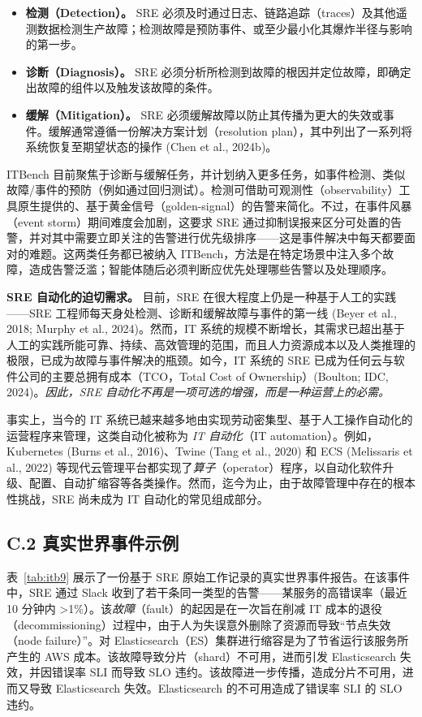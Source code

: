 \begin{itemize}
\item \textbf{检测（Detection）。} SRE 必须及时通过日志、链路追踪（traces）及其他遥测数据检测生产故障；检测故障是预防事件、或至少最小化其爆炸半径与影响的第一步。
\item \textbf{诊断（Diagnosis）。} SRE 必须分析所检测到故障的根因并定位故障，即确定出故障的组件以及触发该故障的条件。
\item \textbf{缓解（Mitigation）。} SRE 必须缓解故障以防止其传播为更大的失效或事件。缓解通常遵循一份解决方案计划（resolution plan），其中列出了一系列将系统恢复至期望状态的操作 (Chen et al., 2024b)。
\end{itemize}

ITBench 目前聚焦于诊断与缓解任务，并计划纳入更多任务，如事件检测、类似故障/事件的预防（例如通过回归测试）。检测可借助可观测性（observability）工具原生提供的、基于黄金信号（golden-signal）的告警来简化。不过，在事件风暴（event storm）期间难度会加剧，这要求 SRE 通过抑制误报来区分可处置的告警，并对其中需要立即关注的告警进行优先级排序——这是事件解决中每天都要面对的难题。这两类任务都已被纳入 ITBench，方法是在特定场景中注入多个故障，造成告警泛滥；智能体随后必须判断应优先处理哪些告警以及处理顺序。

\textbf{SRE 自动化的迫切需求。} 目前，SRE 在很大程度上仍是一种基于人工的实践——SRE 工程师每天身处检测、诊断和缓解故障与事件的第一线 (Beyer et al., 2018; Murphy et al., 2024)。然而，IT 系统的规模不断增长，其需求已超出基于人工的实践所能可靠、持续、高效管理的范围，而且人力资源成本以及人类推理的极限，已成为故障与事件解决的瓶颈。如今，IT 系统的 SRE 已成为任何云与软件公司的主要总拥有成本（TCO，Total Cost of Ownership）(Boulton; IDC, 2024)。\textit{因此，SRE 自动化不再是一项可选的增强，而是一种运营上的必需。}

事实上，当今的 IT 系统已越来越多地由实现劳动密集型、基于人工操作自动化的运营程序来管理，这类自动化被称为 \textit{IT 自动化}（IT automation）。例如，Kubernetes (Burns et al., 2016)、Twine (Tang et al., 2020) 和 ECS (Melissaris et al., 2022) 等现代云管理平台都实现了\textit{算子}（operator）程序，以自动化软件升级、配置、自动扩缩容等各类操作。然而，迄今为止，由于故障管理中存在的根本性挑战，SRE 尚未成为 IT 自动化的常见组成部分。

\subsection{C.2 真实世界事件示例}

表~\ref{tab:itb9} 展示了一份基于 SRE 原始工作记录的真实世界事件报告。在该事件中，SRE 通过 Slack 收到了若干条同一类型的告警——某服务的高错误率（最近 10 分钟内 >1\%）。该\textit{故障}（fault）的起因是在一次旨在削减 IT 成本的退役（decommissioning）过程中，由于人为失误意外删除了资源而导致“节点失效（node failure）”。对 Elasticsearch（ES）集群进行缩容是为了节省运行该服务所产生的 AWS 成本。该故障导致分片（shard）不可用，进而引发 Elasticsearch 失效，并因错误率 SLI 而导致 SLO 违约。该故障进一步传播，造成分片不可用，进而又导致 Elasticsearch 失效。Elasticsearch 的不可用造成了错误率 SLI 的 SLO 违约。

